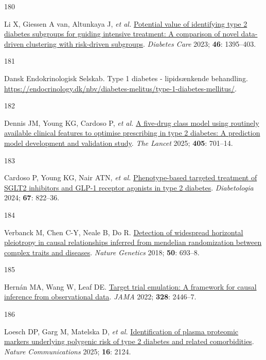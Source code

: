 \documentclass[
  a4paper,
  headsepline=true,
  open=left]{scrbook}
\newlength{\cslhangindent}
\newlength{\csllabelwidth}
\newlength{\cslentryspacingunit} %
\newenvironment{CSLReferences}[2] %
 {%
  \setlength{\parindent}{0pt}
  \ifodd #1
  \let\oldpar\par
  \def\par{\hangindent=\cslhangindent\oldpar}
  \fi
  \setlength{\parskip}{#2\cslentryspacingunit}
 }%
 {}
\newcommand{\CSLLeftMargin}[1]{\parbox[t]{\csllabelwidth}{#1}}
\newcommand{\CSLRightInline}[1]{\parbox[t]{\linewidth - \csllabelwidth}{#1}\break}
\begin{document}
\begin{CSLReferences}{0}{0}
\leavevmode{}%
\CSLLeftMargin{180 }%
\CSLRightInline{Li X, Giessen A van, Altunkaya J, \emph{et al.}
\href{https://doi.org/10.2337/dc22-2170}{Potential value of identifying
type 2 diabetes subgroups for guiding intensive treatment: A comparison
of novel data-driven clustering with risk-driven subgroups}.
\emph{Diabetes Care} 2023; \textbf{46}: 1395--403.}

\leavevmode{}%
\CSLLeftMargin{181 }%
\CSLRightInline{Dansk Endokrinologisk Selskab. Type 1 diabetes -
lipidsænkende behandling.
\url{https://endocrinology.dk/nbv/diabetes-melitus/type-1-diabetes-mellitus/}.}

\leavevmode{}%
\CSLLeftMargin{182 }%
\CSLRightInline{Dennis JM, Young KG, Cardoso P, \emph{et al.}
\href{https://doi.org/10.1016/S0140-6736(24)02617-5}{A five-drug class
model using routinely available clinical features to optimise
prescribing in type 2 diabetes: A prediction model development and
validation study}. \emph{The Lancet} 2025; \textbf{405}: 701--14.}

\leavevmode{}%
\CSLLeftMargin{183 }%
\CSLRightInline{Cardoso P, Young KG, Nair ATN, \emph{et al.}
\href{https://doi.org/10.1007/s00125-024-06099-3}{Phenotype-based
targeted treatment of SGLT2 inhibitors and GLP-1 receptor agonists in
type 2 diabetes}. \emph{Diabetologia} 2024; \textbf{67}: 822--36.}

\leavevmode{}%
\CSLLeftMargin{184 }%
\CSLRightInline{Verbanck M, Chen C-Y, Neale B, Do R.
\href{https://doi.org/10.1038/s41588-018-0099-7}{Detection of widespread
horizontal pleiotropy in causal relationships inferred from mendelian
randomization between complex traits and diseases}. \emph{Nature
Genetics} 2018; \textbf{50}: 693--8.}

\leavevmode{}%
\CSLLeftMargin{185 }%
\CSLRightInline{Hernán MA, Wang W, Leaf DE.
\href{https://doi.org/10.1001/jama.2022.21383}{Target trial emulation: A
framework for causal inference from observational data}. \emph{JAMA}
2022; \textbf{328}: 2446--7.}

\leavevmode{}%
\CSLLeftMargin{186 }%
\CSLRightInline{Loesch DP, Garg M, Matelska D, \emph{et al.}
\href{https://doi.org/10.1038/s41467-025-56695-z}{Identification of
plasma proteomic markers underlying polygenic risk of type 2 diabetes
and related comorbidities}. \emph{Nature Communications} 2025;
\textbf{16}: 2124.}

\end{CSLReferences}
\end{document}
